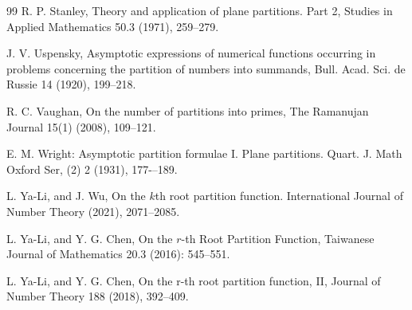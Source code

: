 \documentclass[11pt]{article}
\theoremstyle{plain}
\begin{document}
\begin{thebibliography}{99}
R. P. Stanley, Theory and application of plane partitions. Part 2, Studies in Applied Mathematics 50.3 (1971), 259--279.


J. V. Uspensky, Asymptotic expressions of numerical functions occurring
in problems concerning the partition of numbers into summands,
Bull. Acad. Sci. de Russie 14 (1920), 199--218.


R. C. Vaughan, On the number of partitions into primes, The Ramanujan Journal 15(1) (2008), 109--121.



E. M. Wright: Asymptotic partition formulae I. Plane partitions. Quart. J. Math
Oxford Ser, (2) 2 (1931), 177-–189.


L. Ya-Li, and J. Wu, On the $k$th root partition function. International Journal of Number Theory (2021), 2071--2085.

L. Ya-Li, and Y. G. Chen, On the $ r $-th Root Partition Function, Taiwanese Journal of Mathematics 20.3 (2016): 545--551.

L. Ya-Li, and Y. G. Chen, On the r-th root partition function, II, Journal of Number Theory 188 (2018), 392--409.




%













\end{thebibliography}
		
\end{document}
